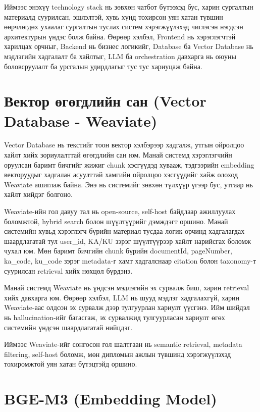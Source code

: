 \documentclass[12pt,A4]{report}
\newcommand{\eng}[1]{#1}
\begin{document}
Иймээс энэхүү \eng{technology stack} нь зөвхөн чатбот бүтээхэд бус, харин сургалтын материалд суурилсан, эшлэлтэй, хувь хүнд тохирсон уян хатан түвшин өөрчлөгдөх ухаалаг сургалтын туслах систем хэрэгжүүлэхэд чиглэсэн нэгдсэн архитектурын үндэс болж байна. Өөрөөр хэлбэл, \eng{Frontend} нь хэрэглэгчтэй харилцах орчныг, \eng{Backend} нь бизнес логикийг, \eng{Database} ба \eng{Vector Database} нь мэдлэгийн хадгалалт ба хайлтыг, \eng{LLM} ба orchestration давхарга нь оюуны боловсруулалт ба урсгалын удирдлагыг тус тус хариуцаж байна.
\section{Вектор өгөгдлийн сан (Vector Database - Weaviate)}

\eng{Vector Database} нь текстийг тоон вектор хэлбэрээр хадгалж, утгын ойролцоо хайлт хийх зориулалттай өгөгдлийн сан юм. Манай системд хэрэглэгчийн оруулсан баримт бичгийг жижиг \eng{chunk} хэсгүүдэд хувааж, тэдгээрийн \eng{embedding} векторуудыг хадгалан асуулттай хамгийн ойролцоо хэсгүүдийг хайж олоход \eng{Weaviate} ашиглаж байна. Энэ нь системийг зөвхөн түлхүүр үгээр бус, утгаар нь хайлт хийдэг болгоно.

\eng{Weaviate}-ийн гол давуу тал нь \eng{open-source}, \eng{self-host} байдлаар ажиллуулах боломжтой, \eng{hybrid search} болон шүүлтүүрийг дэмждэгт оршино. Манай системийн хувьд хэрэглэгч бүрийн материал тусдаа логик орчинд хадгалагдах шаардлагатай тул \eng{user\_id}, \eng{KA/KU} зэрэг шүүлтүүрээр хайлт нарийсгах боломж чухал юм. Мөн баримт бичгийн \eng{chunk} бүрийн \eng{documentId}, \eng{pageNumber}, \eng{ka\_code}, \eng{ku\_code} зэрэг \eng{metadata}-г хамт хадгалснаар citation болон taxonomy-т суурилсан retrieval хийх нөхцөл бүрдэнэ.

Манай системд \eng{Weaviate} нь үндсэн мэдлэгийн эх сурвалж биш, харин retrieval хийх давхарга юм. Өөрөөр хэлбэл, \eng{LLM} нь шууд мэдлэг хадгалахгүй, харин \eng{Weaviate}-аас олдсон эх сурвалж дээр тулгуурлан хариулт үүсгэнэ. Ийм шийдэл нь hallucination-ийг багасгаж, эх сурвалжид тулгуурласан хариулт өгөх системийн үндсэн шаардлагатай нийцдэг.

Иймээс \eng{Weaviate}-ийг сонгосон гол шалтгаан нь \eng{semantic retrieval}, \eng{metadata filtering}, \eng{self-host} боломж, мөн дипломын ажлын түвшинд хэрэгжүүлэхэд тохиромжтой уян хатан бүтэцтэйд оршино.


\section{BGE-M3 (Embedding Model)}
\end{document}
